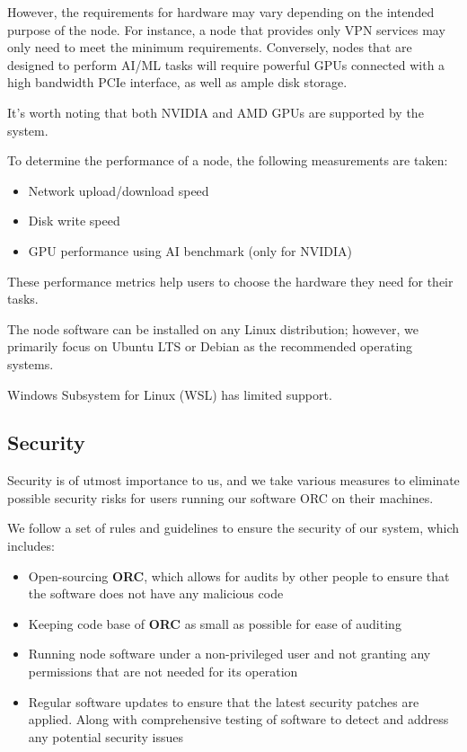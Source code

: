 However, the requirements for hardware may vary depending on the intended purpose of the node. For instance, a node that provides only VPN services may only need to meet the minimum requirements. Conversely, nodes that are designed to perform AI/ML tasks will require powerful GPUs connected with a high bandwidth PCIe interface, as well as ample disk storage.

It's worth noting that both NVIDIA and AMD GPUs are supported by the system.

To determine the performance of a node, the following measurements are taken:

\begin{itemize}
    \item Network upload/download speed
    \item Disk write speed
    \item GPU performance using AI benchmark (only for NVIDIA)
\end{itemize}

These performance metrics help users to choose the hardware they need for their tasks.

The node software can be installed on any Linux distribution; however, we primarily focus on Ubuntu LTS or Debian as the recommended operating systems.

Windows Subsystem for Linux (WSL) has limited support.

\subsection{Security}

Security is of utmost importance to us, and we take various measures to eliminate possible security risks for users running our software ORC on their machines.

We follow a set of rules and guidelines to ensure the security of our system, which includes:

\begin{itemize}
    \item Open-sourcing \textbf{ORC}, which allows for audits by other people to ensure that the software does not have any malicious code
    \item Keeping code base of \textbf{ORC} as small as possible for ease of auditing
    \item Running node software under a non-privileged user and not granting any permissions that are not needed for its operation
    \item Regular software updates to ensure that the latest security patches are applied. Along with comprehensive testing of software to detect and address any potential security issues
\end{itemize}

